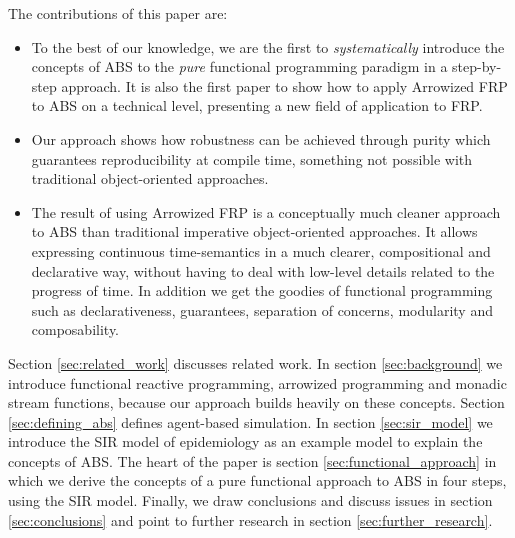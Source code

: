 The contributions of this paper are:
\begin{itemize}
	\item To the best of our knowledge, we are the first to \textit{systematically} introduce the concepts of ABS to the \textit{pure} functional programming paradigm in a step-by-step approach. It is also the first paper to show how to apply Arrowized FRP to ABS on a technical level, presenting a new field of application to FRP.
	\item Our approach shows how robustness can be achieved through purity which guarantees reproducibility at compile time, something not possible with traditional object-oriented approaches.
	\item The result of using Arrowized FRP is a conceptually much cleaner approach to ABS than traditional imperative object-oriented approaches. It allows expressing continuous time-semantics in a much clearer, compositional and declarative way, without having to deal with low-level details related to the progress of time. In addition we get the goodies of functional programming such as declarativeness, guarantees, separation of concerns, modularity and composability.
\end{itemize}

Section \ref{sec:related_work} discusses related work. In section \ref{sec:background} we introduce functional reactive programming, arrowized programming and monadic stream functions, because our approach builds heavily on these concepts. Section \ref{sec:defining_abs} defines agent-based simulation. In section \ref{sec:sir_model} we introduce the SIR model of epidemiology as an example model to explain the concepts of ABS. The heart of the paper is section \ref{sec:functional_approach} in which we derive the concepts of a pure functional approach to ABS in four steps, using the SIR model. Finally, we draw conclusions and discuss issues in section \ref{sec:conclusions} and point to further research in section \ref{sec:further_research}.

